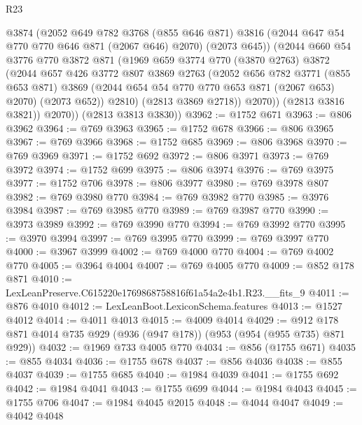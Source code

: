 \begin{lexlean}{R23}
\begin{coremodule}
              @3874
              (@2052
                @649
                @782
                @3768
                (@855 @646 @871)
                @3816
                (@2044 @647 @54 @770 @770 @646 @871 (@2067 @646) @2070)
                (@2073 @645))
              (@2044
                @660
                @54
                @3776
                @770
                @3872
                @871
                (@1969
                  @659
                  @3774
                  @770
                  (@3870 @2763)
                  @3872
                  (@2044
                    @657
                    @426
                    @3772
                    @807
                    @3869
                    @2763
                    (@2052
                      @656
                      @782
                      @3771
                      (@855 @653 @871)
                      @3869
                      (@2044 @654 @54 @770 @770 @653 @871 (@2067 @653) @2070)
                      (@2073 @652))
                    @2810)
                  (@2813 @3869 @2718))
                @2070))
            (@2813 @3816 @3821))
          @2070))
      (@2813 @3813 @3830))
@3962 := @1752 @671
@3963 := @806 @3962
@3964 := @769 @3963
@3965 := @1752 @678
@3966 := @806 @3965
@3967 := @769 @3966
@3968 := @1752 @685
@3969 := @806 @3968
@3970 := @769 @3969
@3971 := @1752 @692
@3972 := @806 @3971
@3973 := @769 @3972
@3974 := @1752 @699
@3975 := @806 @3974
@3976 := @769 @3975
@3977 := @1752 @706
@3978 := @806 @3977
@3980 := @769 @3978 @807
@3982 := @769 @3980 @770
@3984 := @769 @3982 @770
@3985 := @3976 @3984
@3987 := @769 @3985 @770
@3989 := @769 @3987 @770
@3990 := @3973 @3989
@3992 := @769 @3990 @770
@3994 := @769 @3992 @770
@3995 := @3970 @3994
@3997 := @769 @3995 @770
@3999 := @769 @3997 @770
@4000 := @3967 @3999
@4002 := @769 @4000 @770
@4004 := @769 @4002 @770
@4005 := @3964 @4004
@4007 := @769 @4005 @770
@4009 := @852 @178 @871
@4010 := LexLeanPreserve.C615220e1769868758816f61a54a2e4b1.R23.__fits_9
@4011 := @876 @4010
@4012 := LexLeanBoot.LexiconSchema.features
@4013 := @1527 @4012
@4014 := @4011 @4013
@4015 := @4009 @4014
@4029 := @912 @178 @871 @4014 @735 @929 (@936 (@947 @178)) (@953 (@954 (@955 @735) @871 @929))
@4032 := @1969 @733 @4005 @770
@4034 := @856 (@1755 @671)
@4035 := @855 @4034
@4036 := @1755 @678
@4037 := @856 @4036
@4038 := @855 @4037
@4039 := @1755 @685
@4040 := @1984 @4039
@4041 := @1755 @692
@4042 := @1984 @4041
@4043 := @1755 @699
@4044 := @1984 @4043
@4045 := @1755 @706
@4047 := @1984 @4045 @2015
@4048 := @4044 @4047
@4049 := @4042 @4048

\end{coremodule}
\end{lexlean}
